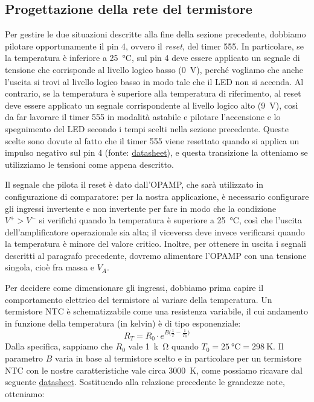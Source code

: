 \documentclass{report}
\begin{document}
\subsection{Progettazione della rete del termistore}\label{rete_termistore}
Per gestire le due situazioni descritte alla fine della sezione precedente, dobbiamo pilotare opportunamente il pin 4, ovvero il \textit{reset}, del timer 555. In particolare, se la temperatura è inferiore a \SI{25}{\celsius}, sul pin 4 deve essere applicato un segnale di tensione che corrisponde al livello logico basso (\SI{0}{\volt}), perché vogliamo che anche l'uscita si trovi al livello logico basso in modo tale che il LED non si accenda. Al contrario, se la temperatura è superiore alla temperatura di riferimento, al reset deve essere applicato un segnale corrispondente al livello logico alto (\SI{9}{\volt}), così da far lavorare il timer 555 in modalità astabile e pilotare l'accensione e lo spegnimento del LED secondo i tempi scelti nella sezione precedente. Queste scelte sono dovute al fatto che il timer 555 viene resettato quando si applica un impulso negativo sul pin 4 (fonte: \textcolor{blue}{\underline{\href{https://www.ti.com/lit/ds/symlink/lm555.pdf?ts=1667144089940&ref_url=https\%253A\%252F\%252Fwww.ti.com\%252Fproduct\%252FLM555}{datasheet}}}), e questa transizione la otteniamo se utilizziamo le tensioni come appena descritto. \par
Il segnale che pilota il reset è dato dall'OPAMP, che sarà utilizzato in configurazione di comparatore: per la nostra applicazione, è necessario configurare gli ingressi invertente e non invertente per fare in modo che la condizione $V^+>V^-$ si verifichi quando la temperatura è superiore a \SI{25}{\celsius}, così che l'uscita dell'amplificatore operazionale sia alta; il viceversa deve invece verificarsi quando la temperatura è minore del valore critico. Inoltre, per ottenere in uscita i segnali descritti al paragrafo precedente, dovremo alimentare l'OPAMP con una tensione singola, cioè fra massa e $V_A$. \par
Per decidere come dimensionare gli ingressi, dobbiamo prima capire il comportamento elettrico del termistore al variare della temperatura. Un termistore NTC è schematizzabile come una resistenza variabile, il cui andamento in funzione della temperatura (in kelvin) è di tipo esponenziale:
$$ R_T = R_0\cdot e^{B\bigl(\frac{1}{T}-\frac{1}{T_0}\bigr)}$$
Dalla specifica, sappiamo che $R_0$ vale \SI{1}{k\ohm} quando $T_0 = \SI{25}{\celsius}=\SI{298}{\kelvin}$. Il parametro $B$ varia in base al termistore scelto e in particolare per un termistore NTC con le nostre caratteristiche vale circa \SI{3000}{\kelvin}, come possiamo ricavare dal seguente \textcolor{blue}{\underline{\href{https://www.mouser.it/datasheet/2/240/Littelfuse_Leaded_Thermistors_Glass_Encapsulated_T-1315924.pdf}{datasheet}}}. Sostituendo alla relazione precedente le grandezze note, otteniamo:
\end{document}
